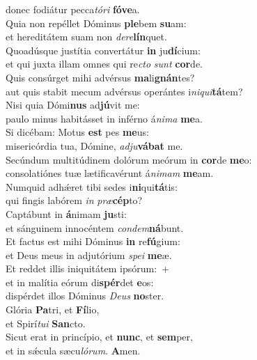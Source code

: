 \oddverse donec fodiátur pecca\textit{tó}\textit{ri} \textbf{fó}\textbf{ve}a.\\
\evenverse Quia non repéllet Dóminus \textbf{ple}bem \textbf{su}am:~\*\\
\evenverse et hereditátem suam non \textit{de}\textit{re}\textbf{lín}quet.\\
\oddverse Quoadúsque justítia convertátur \textbf{in} ju\textbf{dí}cium:~\*\\
\oddverse et qui juxta illam omnes qui re\textit{cto} \textit{sunt} \textbf{cor}de.\\
\evenverse Quis consúrget mihi advérsus \textbf{ma}li\textbf{gnán}tes?~\*\\
\evenverse aut quis stabit mecum advérsus operántes i\textit{ni}\textit{qui}\textbf{tá}tem?\\
\oddverse Nisi quia Dómi\textbf{nus} ad\textbf{jú}vit me:~\*\\
\oddverse paulo minus habitásset in inférno á\textit{ni}\textit{ma} \textbf{me}a.\\
\evenverse Si dicébam: Motus \textbf{est} pes \textbf{me}us:~\*\\
\evenverse misericórdia tua, Dómine, \textit{ad}\textit{ju}\textbf{vá}\textbf{bat} me.\\
\oddverse Secúndum multitúdinem dolórum meórum in \textbf{cor}de \textbf{me}o:~\*\\
\oddverse consolatiónes tuæ lætificavérunt á\textit{ni}\textit{mam} \textbf{me}am.\\
\evenverse Numquid adhǽret tibi sedes i\textbf{ni}qui\textbf{tá}tis:~\*\\
\evenverse qui fingis labórem \textit{in} \textit{præ}\textbf{cép}to?\\
\oddverse Captábunt in \textbf{á}nimam \textbf{ju}sti:~\*\\
\oddverse et sánguinem innocéntem \textit{con}\textit{dem}\textbf{ná}bunt.\\
\evenverse Et factus est mihi Dóminus \textbf{in} re\textbf{fú}gium:~\*\\
\evenverse et Deus meus in adjutórium \textit{spe}\textit{i} \textbf{me}æ.\\
\oddverse Et reddet illis iniquitátem ipsórum:~+\\
\oddverse  et in malítia eórum di\textbf{spér}det \textbf{e}os:~\*\\
\oddverse dispérdet illos Dóminus \textit{De}\textit{us} \textbf{no}ster.\\
\evenverse Glória \textbf{Pa}tri, et \textbf{Fí}lio,~\*\\
\evenverse et Spirí\textit{tu}\textit{i} \textbf{San}cto.\\
\oddverse Sicut erat in princípio, et \textbf{nunc}, et \textbf{sem}per,~\*\\
\oddverse et in sǽcula sæcu\textit{ló}\textit{rum}. \textbf{A}men.\\
